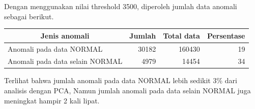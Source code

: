     Dengan menggunakan nilai threshold 3500, diperoleh jumlah data anomali sebagai berikut.

    \begin{table}[h]
        \centering
        \begin{tabular}{|l|r|r|r|}
            \hline
            \multicolumn{1}{|c|}{\textbf{Jenis anomali}} & \multicolumn{1}{c|}{\textbf{Jumlah}} & \multicolumn{1}{c|}{\textbf{Total data}} & \multicolumn{1}{c|}{\textbf{Persentase}} \\ \hline
            Anomali pada data NORMAL                     & 30182                                & 160430                                   & 19                                       \\ \hline
            Anomali pada data selain NORMAL              & 4979                                 & 14454                                    & 34                                       \\ \hline
        \end{tabular}
    \end{table}

    Terlihat bahwa jumlah anomali pada data NORMAL lebih sedikit 3\% dari analisis dengan PCA, Namun jumlah anomali pada data selain NORMAL juga meningkat hampir 2 kali lipat.
